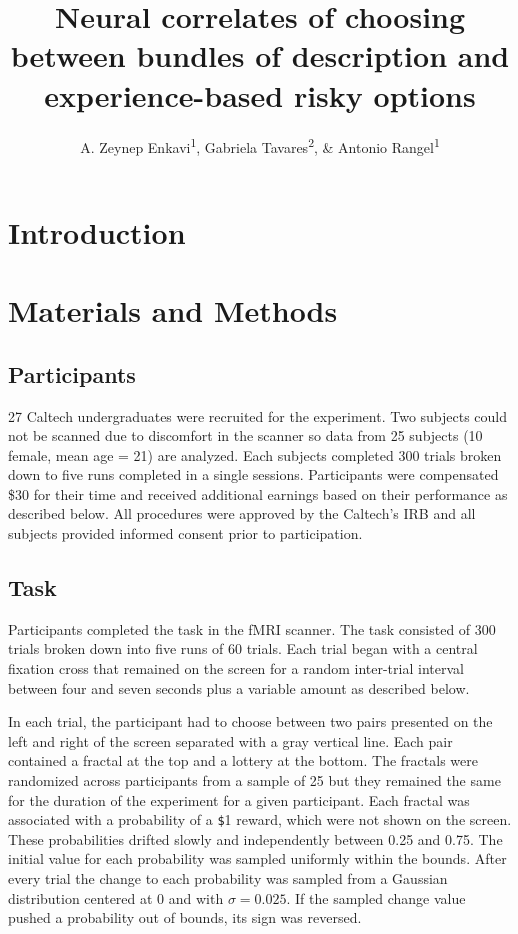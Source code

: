 \documentclass[
  english,
  man]{apa6}
\title{Neural correlates of choosing between bundles of description and experience-based risky options}
\author{A. Zeynep Enkavi\textsuperscript{1}, Gabriela Tavares\textsuperscript{2}, \& Antonio Rangel\textsuperscript{1}}
\date{}
\affiliation{\vspace{0.5cm}\textsuperscript{1} Division of Humanities and Social Sciences, California Institute of Technology\\\textsuperscript{2} Google}
\begin{document}
\maketitle

\hypertarget{introduction}{%
\section{Introduction}\label{introduction}}

\hypertarget{materials-and-methods}{%
\section{Materials and Methods}\label{materials-and-methods}}

\hypertarget{participants}{%
\subsection{Participants}\label{participants}}

27 Caltech undergraduates were recruited for the experiment. Two subjects could not be scanned due to discomfort in the scanner so data from 25 subjects (10 female, mean age = 21) are analyzed. Each subjects completed 300 trials broken down to five runs completed in a single sessions. Participants were compensated \$30 for their time and received additional earnings based on their performance as described below. All procedures were approved by the Caltech's IRB and all subjects provided informed consent prior to participation.

\hypertarget{task}{%
\subsection{Task}\label{task}}

Participants completed the task in the fMRI scanner. The task consisted of 300 trials broken down into five runs of 60 trials. Each trial began with a central fixation cross that remained on the screen for a random inter-trial interval between four and seven seconds plus a variable amount as described below.

In each trial, the participant had to choose between two pairs presented on the left and right of the screen separated with a gray vertical line. Each pair contained a fractal at the top and a lottery at the bottom. The fractals were randomized across participants from a sample of 25 but they remained the same for the duration of the experiment for a given participant. Each fractal was associated with a probability of a \texttt{\$}1 reward, which were not shown on the screen. These probabilities drifted slowly and independently between 0.25 and 0.75. The initial value for each probability was sampled uniformly within the bounds. After every trial the change to each probability was sampled from a Gaussian distribution centered at 0 and with \(\sigma = 0.025\). If the sampled change value pushed a probability out of bounds, its sign was reversed.
\end{document}

